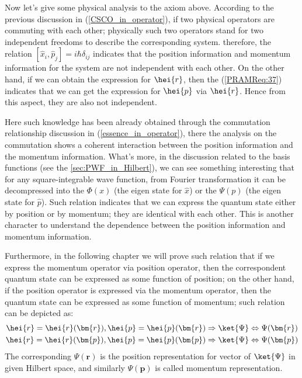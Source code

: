 Now let's give some physical analysis to the axiom above. According
to the previous discussion in (\ref{CSCO_in_operator}), if two
physical operators are commuting with each other; physically such
two operators stand for two independent freedoms to describe the
corresponding system. therefore, the relation $[\hat{x}_{i},
\hat{p}_{j}] = i\hbar\delta_{ij}$ indicates that the position
information and momentum information for the system are not
independent with each other. On the other hand, if we can obtain the
expression for $\hei{r}$, then the (\ref{PRAMReq:37}) indicates that
we can get the expression for $\hei{p}$ via $\hei{r}$. Hence from
this aspect, they are also not independent.

Here such knowledge has been already obtained through the
commutation relationship discussion in (\ref{essence_in_operator}),
there the analysis on the commutation shows a coherent interaction
between the position information and the momentum information.
What's more, in the discussion related to the basis functions (see
the \ref{sec:PWF_in_Hilbert}), we can see something interesting that
for any square-integrable wave function, from Fourier transformation
it can be decompressed into the $\Phi(x)$ (the eigen state for
$\hat{x}$) or the $\Psi(p)$ (the eigen state for $\hat{p}$). Such
relation indicates that we can express the quantum state either by
position or by momentum; they are identical with each other. This is
another character to understand the dependence between the position
information and momentum information.

Furthermore, in the following chapter we will prove such relation
that if we express the momentum operator via position operator, then
the correspondent quantum state can be expressed as some function of
position; on the other hand, if the position operator is expressed
via the momentum operator, then the quantum state can be expressed
as some function of momentum; such relation can be depicted as:
\begin{equation}\label{OPERATOReq:34}
\begin{split}
  \hei{r} = \hei{r}(\bm{r}), \hei{p} = \hei{p}(\bm{r})
  &\Rightarrow
\ket{\Psi} \Leftrightarrow \Psi(\bm{r}) \\
  \hei{r} = \hei{r}(\bm{p}), \hei{p} =
\hei{p}(\bm{p})  &\Rightarrow \ket{\Psi} \Leftrightarrow
\Psi(\bm{p})
\end{split}
\end{equation}
The corresponding $\Psi(\bm{r})$ is the position representation for
vector of $\ket{\Psi}$ in given Hilbert space, and similarly
$\Psi(\bm{p})$ is called momentum representation.

